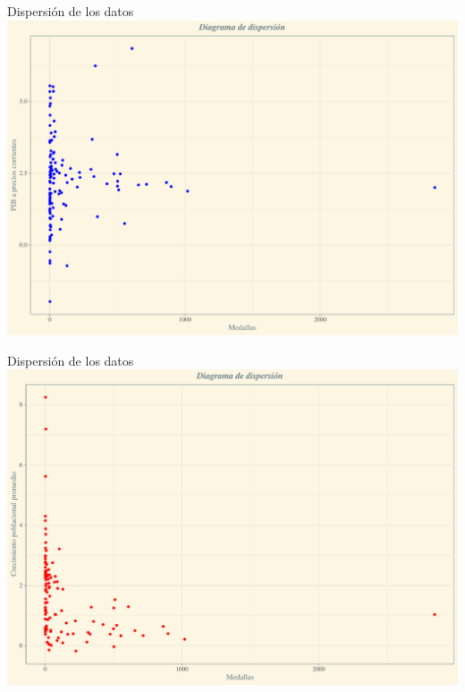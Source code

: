 \documentclass[
  ignorenonframetext,
]{beamer}
\begin{document}
\begin{frame}{Dispersión de los datos}
\protect\hypertarget{dispersiuxf3n-de-los-datos}{}
\includegraphics{Presentacion_files/figure-beamer/unnamed-chunk-12-1.pdf}
\end{frame}

\begin{frame}{Dispersión de los datos}
\protect\hypertarget{dispersiuxf3n-de-los-datos-1}{}
\includegraphics{Presentacion_files/figure-beamer/unnamed-chunk-13-1.pdf}
\end{frame}
\end{document}
